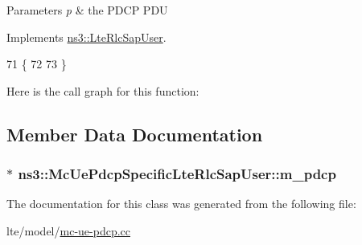 \begin{DoxyParams}{Parameters}
{\em p} & the P\+D\+CP P\+DU \\
\hline
\end{DoxyParams}


Implements \hyperlink{classns3_1_1LteRlcSapUser_a08d268f7a773c87325bffcf8e01031a5}{ns3\+::\+Lte\+Rlc\+Sap\+User}.


\begin{DoxyCode}
71                                                                                         \{
72 
73 \}
\end{DoxyCode}


Here is the call graph for this function\+:




\subsection{Member Data Documentation}
\subsubsection[{\texorpdfstring{m\+\_\+pdcp}{m_pdcp}}]{ $\ast$ ns3\+::\+Mc\+Ue\+Pdcp\+Specific\+Lte\+Rlc\+Sap\+User\+::m\+\_\+pdcp\hspace{0.3cm}{\ttfamily [private]}}\hypertarget{classns3_1_1McUePdcpSpecificLteRlcSapUser_aae5ad7435ef3311aff44b587ae8dcae5}{}\label{classns3_1_1McUePdcpSpecificLteRlcSapUser_aae5ad7435ef3311aff44b587ae8dcae5}


The documentation for this class was generated from the following file\+:\begin{DoxyCompactItemize}
\item 
lte/model/\hyperlink{lte_2model_2mc-ue-pdcp_8cc}{mc-\/ue-\/pdcp.\+cc}\end{DoxyCompactItemize}
